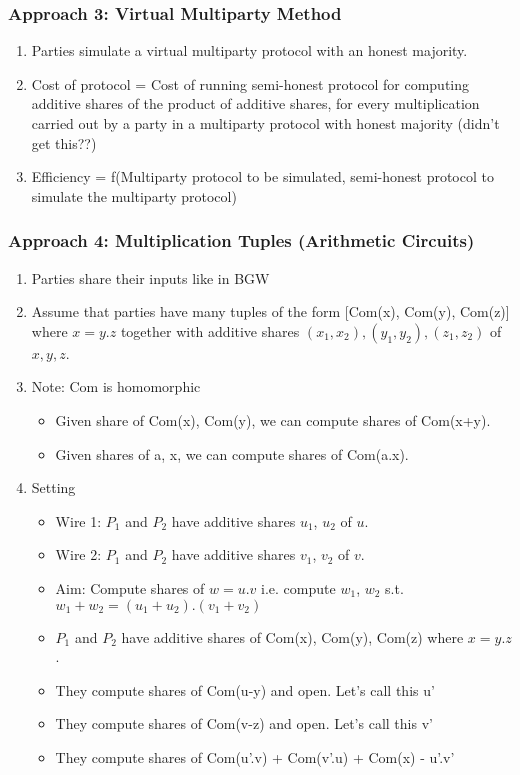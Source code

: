 \subsubsection{Approach 3: Virtual Multiparty Method}
\begin{enumerate}
    \item Parties simulate a virtual multiparty protocol with an honest majority. 
    \item Cost of protocol = Cost of running semi-honest protocol for computing additive shares of the product of additive shares, for every multiplication carried out by a party in a multiparty protocol with honest majority (didn't get this??) 
    \item Efficiency = f(Multiparty protocol to be simulated, semi-honest protocol to simulate the multiparty protocol) 
\end{enumerate}

\subsubsection{Approach 4: Multiplication Tuples (Arithmetic Circuits)}
\begin{enumerate}
    \item Parties share their inputs like in BGW
    \item Assume that parties have many tuples of the form [Com(x), Com(y), Com(z)] where $x = y.z$ together with additive shares $(x_1, x_2), (y_1, y_2), (z_1, z_2)$ of $x, y, z$. 
    \item Note: Com is homomorphic
    \begin{itemize}
        \item Given share of Com(x), Com(y), we can compute shares of Com(x+y).
        \item Given shares of a, x, we can compute shares of Com(a.x). 
    \end{itemize}
    \item Setting 
    \begin{itemize}
        \item Wire 1: $P_1$ and $P_2$ have additive shares $u_1$, $u_2$ of $u$.
        \item Wire 2: $P_1$ and $P_2$ have additive shares $v_1$, $v_2$ of $v$.
        \item Aim: Compute shares of $w=u.v$ i.e. compute $w_1$, $w_2$ s.t. $w_1 + w_2 = (u_1 + u_2).(v_1 + v_2)$
        \item $P_1$ and $P_2$ have additive shares of Com(x), Com(y), Com(z) where $x =y.z$.
        \item They compute shares of Com(u-y) and open. Let's call this u'
        \item They compute shares of Com(v-z) and open. Let's call this v'
        \item They compute shares of Com(u'.v) + Com(v'.u) + Com(x) - u'.v'
    \end{itemize}
\end{enumerate}

